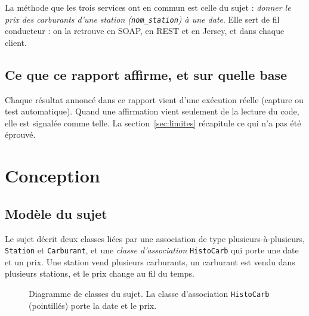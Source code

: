 \documentclass[11pt,a4paper]{article}
\newcommand{\code}[1]{\texttt{#1}}
\begin{document}
La méthode que les trois services ont en commun est celle du sujet : \emph{donner le prix des carburants d'une station (\code{nom\_station}) à une date}. Elle sert de fil conducteur : on la retrouve en SOAP, en REST et en Jersey, et dans chaque client.

\subsection*{Ce que ce rapport affirme, et sur quelle base}
Chaque résultat annoncé dans ce rapport vient d'une exécution réelle (capture ou test automatique). Quand une affirmation vient seulement de la lecture du code, elle est signalée comme telle. La section~\ref{sec:limites} récapitule ce qui n'a pas été éprouvé.

\section{Conception}
\subsection{Modèle du sujet}
Le sujet décrit deux classes liées par une association de type plusieurs-à-plusieurs, \code{Station} et \code{Carburant}, et une \emph{classe d'association} \code{HistoCarb} qui porte une date et un prix. Une station vend plusieurs carburants, un carburant est vendu dans plusieurs stations, et le prix change au fil du temps.

\begin{figure}[H]
\centering
{}
\caption{Diagramme de classes du sujet. La classe d'association \code{HistoCarb} (pointillés) porte la date et le prix.}
\label{fig:classes}
\end{figure}
\end{document}
